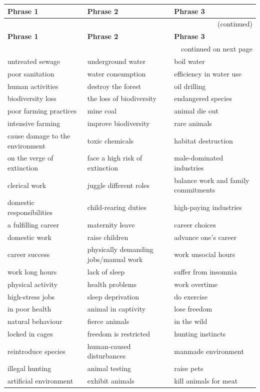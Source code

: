 \documentclass[10pt,a4paper]{article}
\begin{document}
\setlength{\tabcolsep}{8pt}
\renewcommand{\arraystretch}{1.3}
{\large
\begin{longtable}{@{}*{3}{p{}}@{}}
\toprule
\textbf{Phrase 1} & \textbf{Phrase 2} & \textbf{Phrase 3} \\ \midrule
\endfirsthead
\multicolumn{3}{r}{\footnotesize (continued)} \\
\toprule
\textbf{Phrase 1} & \textbf{Phrase 2} & \textbf{Phrase 3} \\ \midrule
\endhead
\midrule
\multicolumn{3}{r}{\footnotesize continued on next page} \\
\endfoot
\bottomrule
\endlastfoot
untreated sewage & underground water & boil water \\
poor sanitation & water consumption & efficiency in water use \\
human activities & destroy the forest & oil drilling \\
biodiversity loss & the loss of biodiversity & endangered species \\
poor farming practices & mine coal & animal die out \\
intensive farming & improve biodiversity & rare animals \\
cause damage to the environment & toxic chemicals & habitat destruction \\
on the verge of extinction & face a high risk of extinction & male-dominated industries \\
clerical work & juggle different roles & balance work and family commitments \\
domestic responsibilities & child-rearing duties & high-paying industries \\
a fulfilling career & maternity leave & career choices \\
domestic work & raise children & advance one's career \\
career success & physically demanding jobs/manual work & work unsocial hours \\
work long hours & lack of sleep & suffer from insomnia \\
physical activity & health problems & work overtime \\
high-stress jobs & sleep deprivation & do exercise \\
in poor health & animal in captivity & lose freedom \\
natural behaviour & fierce animals & in the wild \\
locked in cages & freedom is restricted & hunting instincts \\
reintroduce species & human-caused disturbances & manmade environment \\
illegal hunting & animal testing & raise pets \\
artificial environment & exhibit animals & kill animals for meat \\
\end{longtable}}
\end{document}

